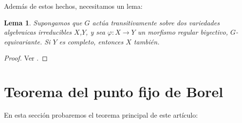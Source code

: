 \documentclass[spanish,10pt]{amsart}
\newtheorem{lemma}[theorem]{Lema}
\theoremstyle{definition}
\theoremstyle{remark}
\numberwithin{equation}{section}
\begin{document}
Además de estos hechos, necesitamos un lema:

\begin{lemma}\label{lema:lema para variedades completas}
Supongamos que $G$ actúa transitivamente sobre dos variedades algebraicas irreducibles $X$,$Y$, y sea $\varphi : X \to Y$ un morfismo regular biyectivo, $G$-equivariante. Si $Y$ es completo, entonces $X$ también.
\end{lemma}
\begin{proof}
Ver \cite[Lema \S 21.1]{humphreys2012linearAlgebraicGroups}.
\end{proof}


\section{Teorema del punto fijo de Borel}

En esta sección probaremos el teorema principal de este artículo:
\end{document}
